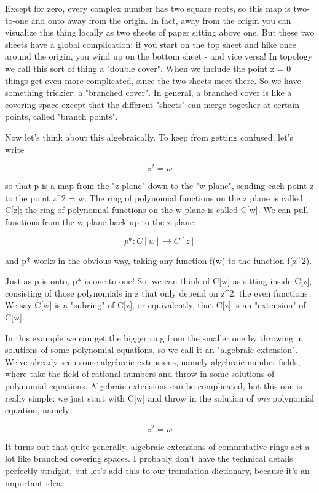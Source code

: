 Except for zero, every complex number has two square roots, so this map 
is two-to-one and onto away from the origin.  In fact, away from the 
origin you can visualize this thing locally as two sheets of paper 
sitting above one.  But these two sheets have a global complication: if 
you start on the top sheet and hike once around the origin, you wind up 
on the bottom sheet - and vice versa!  In topology we call this sort of 
thing a "double cover".  When we include the point z = 0 things get 
even more complicated, since the two sheets meet there.  So we have 
something trickier: a "branched cover". In general, a branched cover 
is like a covering space except that the different "sheets" can merge
together at certain points, called "branch points". 

Now let's think about this algebraically.  To keep from getting confused,
let's write 

$$
z^{2} = w
$$
    

so that p is a map from the "z plane" down to the "w plane", sending each 
point z to the point z^{2} = w.  The ring of polynomial 
functions on the z
plane is called C[z]; the ring of polynomial functions on the w plane is
called C[w].  We can pull functions from the w plane back up to the z 
plane:

$$
p*: C[w] \to  C[z]
$$
    

and p* works in the obvious way, taking any 
function f(w) to the function f(z^{2}).

Just as p is onto, p* is one-to-one!  So, we can think of C[w] as 
sitting inside C[z], consisting of those polynomials in z that only 
depend on z^{2}: the even functions.  We say C[w] 
is a "subring" of C[z], 
or equivalently, that C[z] is an "extension" of C[w].   

In this example we can get the bigger ring from the smaller one by 
throwing in solutions of some polynomial equations, so we call it an 
"algebraic extension".  We've already seen some algebraic extensions,
namely algebraic number fields, where take the field of rational numbers
and throw in some solutions of polynomial equations.  Algebraic extensions 
can be complicated, but this one is really simple: we just start with 
C[w] and throw in the solution of \emph{one} polynomial equation, namely


$$

z^{2} = w
$$
    

It turns out that quite generally, algebraic extensions of commutative
rings act a lot like branched covering spaces.  I probably don't have 
the technical details perfectly straight, but let's add this to our
translation dictionary, because it's an important idea:


